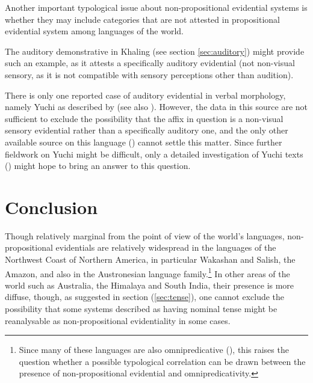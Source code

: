 \documentclass[oneside,a4paper,11pt]{article}
\newcommand{\ipa}[1]{{\phon \mbox{#1}}} %
\begin{document}

Another important typological issue about non-propositional evidential systems is whether they may include categories that are not attested in propositional evidential system among languages of the world.

The auditory demonstrative in Khaling (see section \ref{sec:auditory}) might provide such an example, as it attests a specifically auditory evidential (not non-visual sensory, as it is not compatible with sensory perceptions other than audition).

   There is only one reported case of auditory evidential in verbal morphology, namely  Yuchi as described by \citet{linn01euchee} (see also \citealt[37]{aikhenvald06}). However, the data in this source are not sufficient to exclude the possibility that the affix in question is a non-visual sensory evidential rather than a specifically auditory one, and the only other available source on this language (\citealt{wagner38yuchi}) cannot settle this matter. Since further fieldwork on Yuchi might be difficult, only a detailed investigation of Yuchi texts (\citealt{wagner31tales}) might hope to bring an answer to this question.

\section{Conclusion}
Though relatively marginal from the point of view of the world's languages, non-propositional evidentials are relatively widespread in the languages of the Northwest Coast of Northern America, in particular Wakashan and Salish, the Amazon, and also in the  Austronesian language family.\footnote{Since many of these languages are also omnipredicative (\citealt{launey94, francois03predicat}), this raises the question whether a possible typological correlation can be drawn between the presence of non-propositional evidential and omnipredicativity. } In other areas of the world such as Australia, the Himalaya and South India, their presence is more diffuse, though, as suggested in section (\ref{sec:tense}), one cannot exclude the possibility that some systems described as having nominal tense might be reanalysable  as non-propositional evidentiality in some cases.
\end{document}

